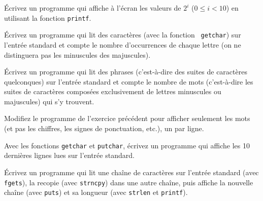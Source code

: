 %


% 


\question

Écrivez un programme qui affiche à l'écran les valeurs de $2^i$ ($0
\leq i < 10$) en utilisant la fonction {\tt printf}.


\question

Écrivez un programme qui lit des caractères (avec la fonction {\tt
getchar}) sur l'entrée standard et compte le nombre d'occurrences de
chaque lettre (on ne distinguera pas les minuscules des majuscules).

\question

Écrivez un programme qui lit des phrases (c'est-à-dire des suites de
caractères quelconques) sur l'entrée standard et compte le nombre de
mots (c'est-à-dire les suites de caractères composées exclusivement de
lettres minuscules ou majuscules) qui s'y trouvent.


\question

Modifiez le programme de l'exercice précédent pour afficher seulement
les mots (et pas les chiffres, les signes de ponctuation, etc.), un par
ligne.


\question

Avec les fonctions {\tt getchar} et {\tt putchar}, écrivez un programme
qui affiche les 10 dernières lignes lues sur l'entrée standard.


\question

Écrivez un programme qui lit une chaîne de caractères sur l'entrée
standard (avec {\tt fgets}), la recopie (avec {\tt strncpy}) dans une
autre chaîne, puis affiche la nouvelle chaîne (avec {\tt puts}) et
sa longueur (avec {\tt strlen} et {\tt printf}).


